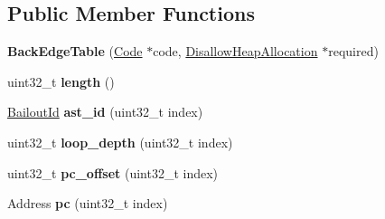 \subsection*{Public Member Functions}
\begin{DoxyCompactItemize}
\item 
\hypertarget{classv8_1_1internal_1_1_back_edge_table_a7db2b9b7aa7720c9ed264ad8514f590e}{}{\bfseries Back\+Edge\+Table} (\hyperlink{classv8_1_1internal_1_1_code}{Code} $\ast$code, \hyperlink{classv8_1_1internal_1_1_per_thread_assert_scope_debug_only}{Disallow\+Heap\+Allocation} $\ast$required)\label{classv8_1_1internal_1_1_back_edge_table_a7db2b9b7aa7720c9ed264ad8514f590e}

\item 
\hypertarget{classv8_1_1internal_1_1_back_edge_table_a56b23e90b541646f83902eb5e8653205}{}uint32\+\_\+t {\bfseries length} ()\label{classv8_1_1internal_1_1_back_edge_table_a56b23e90b541646f83902eb5e8653205}

\item 
\hypertarget{classv8_1_1internal_1_1_back_edge_table_ad2833701689e96f451ab733f1fea52a3}{}\hyperlink{classv8_1_1internal_1_1_bailout_id}{Bailout\+Id} {\bfseries ast\+\_\+id} (uint32\+\_\+t index)\label{classv8_1_1internal_1_1_back_edge_table_ad2833701689e96f451ab733f1fea52a3}

\item 
\hypertarget{classv8_1_1internal_1_1_back_edge_table_a4385d5f565fb0623ec77a3e150f5b770}{}uint32\+\_\+t {\bfseries loop\+\_\+depth} (uint32\+\_\+t index)\label{classv8_1_1internal_1_1_back_edge_table_a4385d5f565fb0623ec77a3e150f5b770}

\item 
\hypertarget{classv8_1_1internal_1_1_back_edge_table_a287333d13fd7c286ff7751a1c0465d75}{}uint32\+\_\+t {\bfseries pc\+\_\+offset} (uint32\+\_\+t index)\label{classv8_1_1internal_1_1_back_edge_table_a287333d13fd7c286ff7751a1c0465d75}

\item 
\hypertarget{classv8_1_1internal_1_1_back_edge_table_aea67e907fbd52b3fe1762f8a6c333259}{}Address {\bfseries pc} (uint32\+\_\+t index)\label{classv8_1_1internal_1_1_back_edge_table_aea67e907fbd52b3fe1762f8a6c333259}

\end{DoxyCompactItemize}
